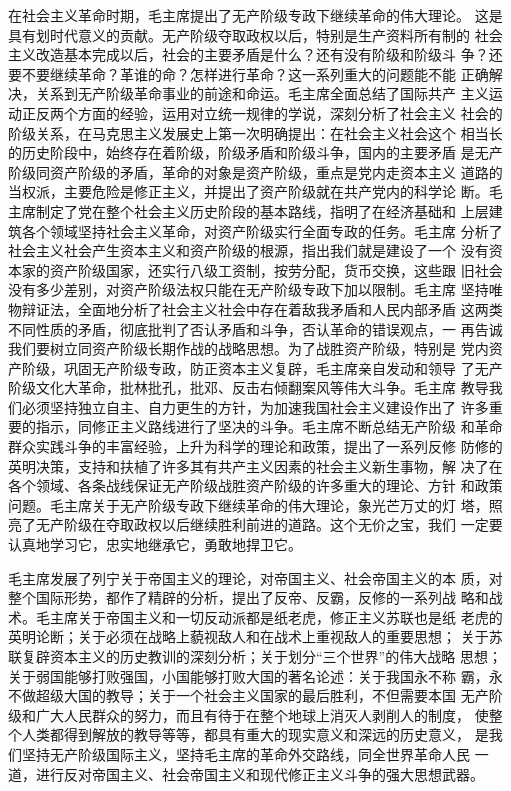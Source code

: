 \begin{hongqiarticle}
    在社会主义革命时期，毛主席提出了无产阶级专政下继续革命的伟大理论。
    这是具有划时代意义的贡献。无产阶级夺取政权以后，特别是生产资料所有制的
    社会主义改造基本完成以后，社会的主要矛盾是什么？还有没有阶级和阶级斗
    争？还要不要继续革命？革谁的命？怎样进行革命？这一系列重大的问题能不能
    正确解决，关系到无产阶级革命事业的前途和命运。毛主席全面总结了国际共产
    主义运动正反两个方面的经验，运用对立统一规律的学说，深刻分析了社会主义
    社会的阶级关系，在马克思主义发展史上第一次明确提出：在社会主义社会这个
    相当长的历史阶段中，始终存在着阶级，阶级矛盾和阶级斗争，国内的主要矛盾
    是无产阶级同资产阶级的矛盾，革命的对象是资产阶级，重点是党内走资本主义
    道路的当权派，主要危险是修正主义，并提出了资产阶级就在共产党内的科学论
    断。毛主席制定了党在整个社会主义历史阶段的基本路线，指明了在经济基础和
    上层建筑各个领域坚持社会主义革命，对资产阶级实行全面专政的任务。毛主席
    分析了社会主义社会产生资本主义和资产阶级的根源，指出我们就是建设了一个
    没有资本家的资产阶级国家，还实行八级工资制，按劳分配，货币交换，这些跟
    旧社会没有多少差别，对资产阶级法权只能在无产阶级专政下加以限制。毛主席
    坚持唯物辩证法，全面地分析了社会主义社会中存在着敌我矛盾和人民内部矛盾
    这两类不同性质的矛盾，彻底批判了否认矛盾和斗争，否认革命的错误观点，一
    再告诚我们要树立同资产阶级长期作战的战略思想。为了战胜资产阶级，特别是
    党内资产阶级，巩固无产阶级专政，防正资本主义复辟，毛主席亲自发动和领导
    了无产阶级文化大革命，批林批孔，批邓、反击右倾翻案风等伟大斗争。毛主席
    教导我们必须坚持独立自主、自力更生的方针，为加速我国社会主义建设作出了
    许多重要的指示，同修正主义路线进行了坚决的斗争。毛主席不断总结无产阶级
    和革命群众实践斗争的丰富经验，上升为科学的理论和政策，提出了一系列反修
    防修的英明决策，支持和扶植了许多其有共产主义因素的社会主义新生事物，解
    决了在各个领域、各条战线保证无产阶级战胜资产阶级的许多重大的理论、方针
    和政策问题。毛主席关于无产阶级专政下继续革命的伟大理论，象光芒万丈的灯
    塔，照亮了无产阶级在夺取政权以后继续胜利前进的道路。这个无价之宝，我们
    一定要认真地学习它，忠实地继承它，勇敢地捍卫它。
    
    毛主席发展了列宁关于帝国主义的理论，对帝国主义、社会帝国主义的本
    质，对整个国际形势，都作了精辟的分析，提出了反帝、反霸，反修的一系列战
    略和战术。毛主席关于帝国主义和一切反动派都是纸老虎，修正主义苏联也是纸
    老虎的英明论断；关于必须在战略上藐视敌人和在战术上重视敌人的重要思想；
    关于苏联复辟资本主义的历史教训的深刻分析；关于划分“三个世界”的伟大战略
    思想；关于弱国能够打败强国，小国能够打败大国的著名论述：关于我国永不称
    霸，永不做超级大国的教导；关于一个社会主义国家的最后胜利，不但需要本国
    无产阶级和广大人民群众的努力，而且有待于在整个地球上消灭人剥削人的制度，
    使整个人类都得到解放的教导等等，都具有重大的现实意义和深远的历史意义，
    是我们坚持无产阶级国际主义，坚持毛主席的革命外交路线，同全世界革命人民
    一道，进行反对帝国主义、社会帝国主义和现代修正主义斗争的强大思想武器。
    

\end{hongqiarticle}
